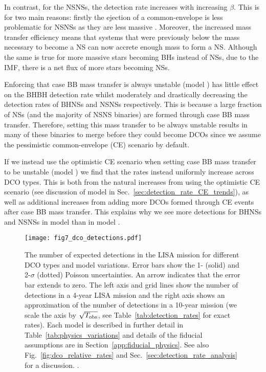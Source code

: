 In contrast, for the NSNSs, the detection rate increases with increasing $\beta$. This is for two main reasons: firstly the ejection of a common-envelope is less problematic for NSNSs as they are less massive \citep[e.g.][]{Kruckow+2018}. Moreover, the increased mass transfer efficiency means that systems that were previously below the mass necessary to become a NS can now accrete enough mass to form a NS. Although the same is true for more massive stars becoming BHs instead of NSs, due to the IMF, there is a net flux of more stars becoming NSs.

Enforcing that case BB mass transfer is always unstable (model \modCaseBB{}) has little effect on the BHBH detection rate whilst moderately and drastically decreasing the detection rates of BHNSs and NSNSs respectively. This is because a large fraction of NSs (and the majority of NSNS binaries) are formed through case BB mass transfer. Therefore, setting this mass transfer to be always unstable results in many of these binaries to merge before they could become DCOs since we assume the pessimistic common-envelope (CE) scenario by default.

If we instead use the optimistic CE scenario when setting case BB mass transfer to be unstable (model \modCaseBBOpt{}) we find that the rates instead uniformly increase across DCO types. This is both from the natural increases from using the optimistic CE scenario (see discussion of model \modOpt{} in Sec.~\ref{sec:detection_rate_CE_trends}), as well as additional increases from adding more DCOs formed through CE events after case BB mass transfer. This explains why we see more detections for BHNSs and NSNSs in model \modCaseBBOpt{} than in model \modOpt{}.

\begin{figure*}[p]
    \centering
    \texttt{[image: fig7\_dco\_detections.pdf]}
    \caption{The number of expected detections in the LISA mission for different DCO types and model variations. Error bars show the 1- (solid) and 2-$\sigma$ (dotted) Poisson uncertainties. An arrow indicates that the error bar extends to zero. The left axis and grid lines show the number of detections in a 4-year LISA mission and the right axis shows an approximation of the number of detections in a 10-year mission (we scale the axis by $\sqrt{T_{\rm obs}}$, see Table~\ref{tab:detection_rates} for exact rates). Each model is described in further detail in Table~\ref{tab:physics_variations} and details of the fiducial assumptions are in Section~\ref{app:fiducial_physics}. See also Fig.~\ref{fig:dco_relative_rates} and Sec.~\ref{sec:detection_rate_analysis} for a discussion. \href{https://github.com/TomWagg/detecting-DCOs-in-LISA/blob/main/paper/figures/fig7_dco_detections.png}{\faFileImage} \href{https://github.com/TomWagg/detecting-DCOs-in-LISA/blob/main/paper/figure_notebooks/variations.ipynb}{\faBook}.}
    \label{fig:detection_rates}
\end{figure*}

